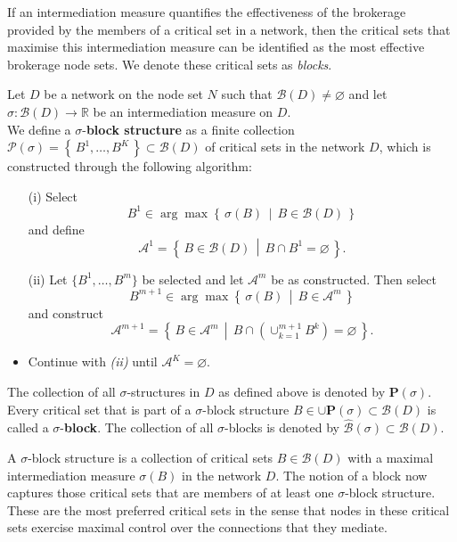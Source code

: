 If an intermediation measure quantifies the effectiveness of the brokerage provided by the members of a critical set in a network, then the critical sets that maximise this intermediation measure can be identified as the most effective brokerage node sets. We denote these critical sets as \emph{blocks}.
\begin{definition} \label{def:block}
Let $D$ be a network on the node set $N$ such that $\mathcal{B} (D) \neq \varnothing$ and let $\sigma \colon \mathcal{B} (D) \to \mathbb{R}$ be an intermediation measure on $D$.
\\
We define a $\sigma$-\textbf{block structure} as a finite collection $\mathcal{P} (\sigma ) = \left\{ \, B^1, \ldots ,B^K \, \right\} \subset \mathcal{B} (D)$ of critical sets in the network $D$, which is constructed through the following algorithm:
\begin{itemize}
\item[(i)] Select
\[
B^1 \in \arg\max \left\{ \, \sigma (B) \, \middle| \, B \in \mathcal{B} (D) \, \right\}
\]
and define
\[
\mathcal{A}^1 = \left\{ \, B \in \mathcal{B} (D) \, \middle| \, B \cap B^1 = \varnothing \, \right\} .
\]

\item[(ii)] Let $\{ B^1 , \ldots ,B^m \}$ be selected and let $\mathcal{A}^m$ be as constructed. Then select
\begin{equation}
B^{m+1} \in \arg\max \left\{ \, \sigma (B) \, \middle| \, B \in \mathcal{A}^m \, \right\}
\end{equation}
and construct
\begin{equation}
\mathcal{A}^{m+1} = \left\{ \, B \in \mathcal{A}^m \, \middle| \, B \cap \left( \cup^{m+1}_{k=1} B^k \right) = \varnothing \, \right\} .
\end{equation}

\item Continue with \emph{(ii)} until $\mathcal{A}^K = \varnothing$.
\end{itemize}
The collection of all $\sigma$-structures in $D$ as defined above is denoted by  $\mathbf{P} ( \sigma )$.
\\
Every critical set that is part of a $\sigma$-block structure $B \in \cup \mathbf{P} (\sigma ) \subset \mathcal{B} (D)$ is called a $\sigma$-\textbf{block}. The collection of all $\sigma$-blocks is denoted by $\widehat{\mathcal{B}} (\sigma ) \subset \mathcal{B} (D)$.
\end{definition}
A $\sigma$-block structure is a collection of critical sets $B \in \mathcal{B} (D)$ with a maximal intermediation measure $\sigma (B)$ in the network $D$. The notion of a block now captures those critical sets that are members of at least one $\sigma$-block structure. These are the most preferred critical sets in the sense that nodes in these critical sets exercise maximal control over the connections that they mediate.

